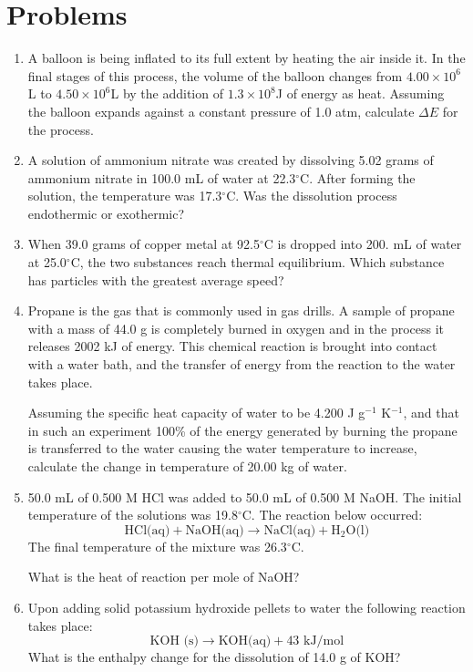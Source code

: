 \documentclass[../chem.tex]{subfiles}
\begin{document}
\section*{Problems}
\begin{enumerate}
    \item A balloon is being inflated to its full extent by heating the air inside it. In the final stages of this process, the volume of the balloon changes from $4.00\times 10^6$L to $4.50\times 10^6$L by the addition of $1.3\times 10^8$J of energy as heat. 
    Assuming the balloon expands against a constant pressure of 1.0 atm, calculate $\Delta E$ for the process.
    \item A solution of ammonium nitrate was created by dissolving 5.02 grams of ammonium nitrate in 100.0 mL of water at 22.3$^{\circ}$C. After forming the solution, the temperature was 17.3$^{\circ}$C. Was the dissolution process endothermic or exothermic?
    \item When 39.0 grams of copper metal at 92.5$^{\circ}$C is dropped into 200. mL of water at 25.0$^{\circ}$C, the two substances reach thermal equilibrium. Which substance has particles with the greatest average speed?
    \item Propane is the gas that is commonly used in gas drills. A sample of propane with a mass of 44.0 g is completely burned in oxygen and in the process 
    it releases 2002 kJ of energy. This chemical reaction is brought into contact with a water bath, and the transfer of energy from the reaction to the water takes place.

    Assuming the specific heat capacity of water to be 4.200 J g$^{-1}$ K$^{-1}$, and that in such an experiment 100\% of the energy generated 
    by burning the propane is transferred to the water causing the water temperature to increase, calculate the change in temperature of 20.00 kg of water.

    \item 50.0 mL of 0.500 M HCl was added to 50.0 mL of 0.500 M NaOH. The initial temperature of the solutions was 19.8$^{\circ}$C. The reaction below occurred:
    \[\text{HCl(aq)}+\text{NaOH(aq)}\rightarrow \text{NaCl(aq)}+\text{H}_2\text{O(l)}\]
    The final temperature of the mixture was 26.3$^{\circ}$C.

    What is the heat of reaction per mole of NaOH?

    \item Upon adding solid potassium hydroxide pellets to water the following reaction takes place:
    \[\text{KOH (s)} \rightarrow \text{KOH(aq)}+43\text{ kJ/mol}\]
    What is the enthalpy change for the dissolution of 14.0 g of KOH?


\end{enumerate}
\end{document}
